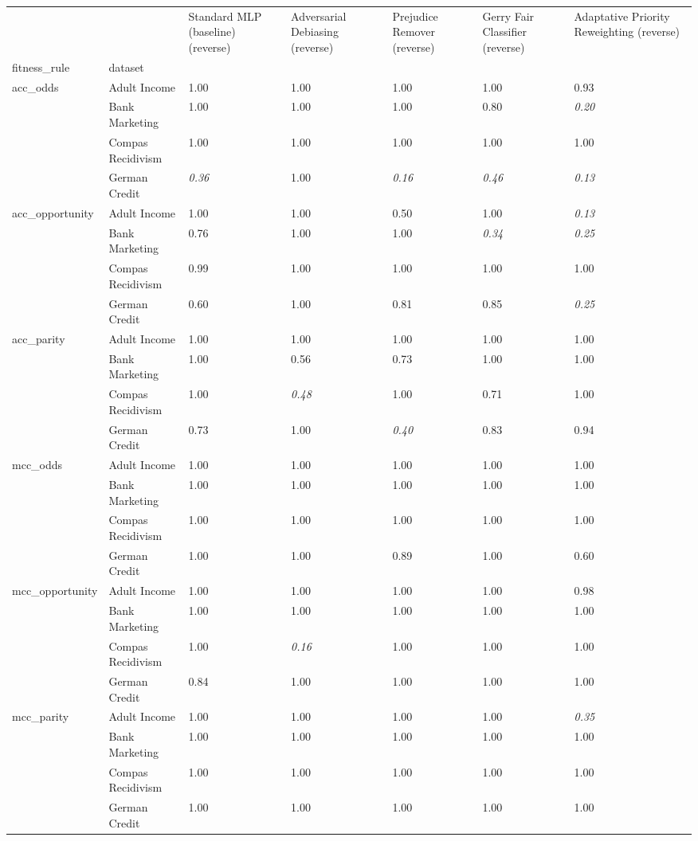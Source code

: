 \begin{tabular}{lllllll}
\toprule
 &  & Standard MLP (baseline) (reverse) & Adversarial Debiasing (reverse) & Prejudice Remover (reverse) & Gerry Fair Classifier (reverse) & Adaptative Priority Reweighting (reverse) \\
fitness_rule & dataset &  &  &  &  &  \\
\midrule
\multirow[t]{4}{*}{acc_odds} & Adult Income & 1.00 & 1.00 & 1.00 & 1.00 & 0.93 \\
 & Bank Marketing & 1.00 & 1.00 & 1.00 & 0.80 & \textit{0.20} \\
 & Compas Recidivism & 1.00 & 1.00 & 1.00 & 1.00 & 1.00 \\
 & German Credit & \textit{0.36} & 1.00 & \textit{0.16} & \textit{0.46} & \textit{0.13} \\
\cline{1-7}
\multirow[t]{4}{*}{acc_opportunity} & Adult Income & 1.00 & 1.00 & 0.50 & 1.00 & \textit{0.13} \\
 & Bank Marketing & 0.76 & 1.00 & 1.00 & \textit{0.34} & \textit{0.25} \\
 & Compas Recidivism & 0.99 & 1.00 & 1.00 & 1.00 & 1.00 \\
 & German Credit & 0.60 & 1.00 & 0.81 & 0.85 & \textit{0.25} \\
\cline{1-7}
\multirow[t]{4}{*}{acc_parity} & Adult Income & 1.00 & 1.00 & 1.00 & 1.00 & 1.00 \\
 & Bank Marketing & 1.00 & 0.56 & 0.73 & 1.00 & 1.00 \\
 & Compas Recidivism & 1.00 & \textit{0.48} & 1.00 & 0.71 & 1.00 \\
 & German Credit & 0.73 & 1.00 & \textit{0.40} & 0.83 & 0.94 \\
\cline{1-7}
\multirow[t]{4}{*}{mcc_odds} & Adult Income & 1.00 & 1.00 & 1.00 & 1.00 & 1.00 \\
 & Bank Marketing & 1.00 & 1.00 & 1.00 & 1.00 & 1.00 \\
 & Compas Recidivism & 1.00 & 1.00 & 1.00 & 1.00 & 1.00 \\
 & German Credit & 1.00 & 1.00 & 0.89 & 1.00 & 0.60 \\
\cline{1-7}
\multirow[t]{4}{*}{mcc_opportunity} & Adult Income & 1.00 & 1.00 & 1.00 & 1.00 & 0.98 \\
 & Bank Marketing & 1.00 & 1.00 & 1.00 & 1.00 & 1.00 \\
 & Compas Recidivism & 1.00 & \textit{0.16} & 1.00 & 1.00 & 1.00 \\
 & German Credit & 0.84 & 1.00 & 1.00 & 1.00 & 1.00 \\
\cline{1-7}
\multirow[t]{4}{*}{mcc_parity} & Adult Income & 1.00 & 1.00 & 1.00 & 1.00 & \textit{0.35} \\
 & Bank Marketing & 1.00 & 1.00 & 1.00 & 1.00 & 1.00 \\
 & Compas Recidivism & 1.00 & 1.00 & 1.00 & 1.00 & 1.00 \\
 & German Credit & 1.00 & 1.00 & 1.00 & 1.00 & 1.00 \\
\cline{1-7}
\bottomrule
\end{tabular}
